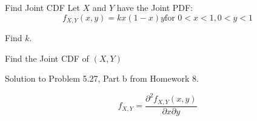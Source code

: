                         \begin{example}[Problem 5.27]{Find Joint CDF}
                          Let $X$ and $Y$ have the Joint PDF:
                          \begin{equation*}
                            f_{X,Y} \left( x,y \right) = k x \left( 1-x \right) y \text{for } 0<x<1, 0<y<1
                          \end{equation*}
                                                   
                          \begin{boldalphlist}
                          \item Find $k$.
                          \item Find the Joint CDF of $\left( X,Y \right)$
                          \end{boldalphlist}

                          \tcblower

                          Solution to Problem 5.27, Part b from Homework 8.
                        \end{example}
			\begin{propertylist}[resume]
				\item 
					\begin{equation}
						f_{X,Y} = \frac{\partial^{2} f_{X,Y} \left( x,y \right)}{\partial x \partial y} 
					\end{equation}
			\end{propertylist}
			

